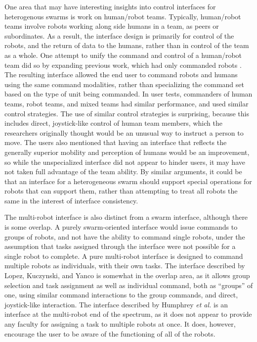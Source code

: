 One area that may have interesting insights into control interfaces for heterogenous swarms is work on human/robot teams. 
Typically, human/robot teams involve robots working along side humans in a team, as peers or subordinates. 
As a result, the interface design is primarily for control of the robots, and the return of data to the humans, rather than in control of the team as a whole.
One attempt to unify the command and control of a human/robot team did so by expanding previous work, which had only commanded robots \citep{lopez2017unified}. 
The resulting interface allowed the end user to command robots and humans using the same command modalities, rather than specializing the command set based on the type of unit being commanded. 
In user tests, commanders of human teams, robot teams, and mixed teams had similar performance, and used similar control strategies.
The use of similar control strategies is surprising, because this includes direct, joystick-like control of human team members, which the researchers originally thought would be an unusual way to instruct a person to move. 
The users also mentioned that having an interface that reflects the generally superior mobility and perception of humans would be an improvement, so while the unspecialized interface did not appear to hinder users, it may have not taken full advantage of the team ability. 
By similar arguments, it could be that an interface for a heterogeneous swarm should support special operations for robots that can support them, rather than attempting to treat all robots the same in the interest of interface consistency. 

The multi-robot interface is also distinct from a swarm interface, although there is some overlap. 
A purely swarm-oriented interface would issue commands to groups of robots, and not have the ability to command single robots, under the assumption that tasks assigned through the interface were not possible for a single robot to complete. 
A pure multi-robot interface is designed to command multiple robots as individuals, with their own tasks. 
The interface described by Lopez, Kuczynski, and Yanco is somewhat in the overlap area, as it allows group selection and task assignment as well as individual command, both as ``groups'' of one, using similar command interactions to the group commands, and direct, joystick-like interaction. 
The interface described by Humphrey \emph{et al.} is an interface at the multi-robot end of the spectrum, as it does not appear to provide any faculty for assigning a task to multiple robots at once.
It does, however, encourage the user to be aware of the functioning of all of the robots. 

